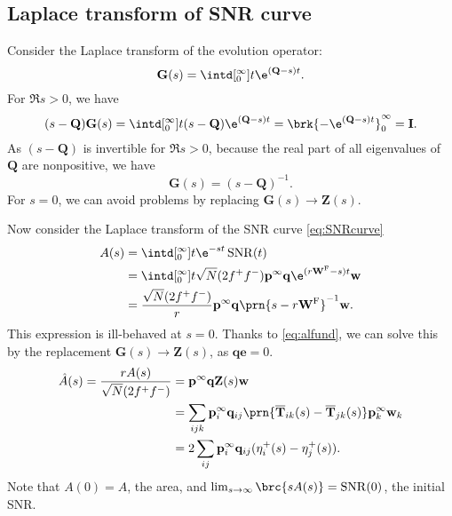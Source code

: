 \documentclass[12pt]{article}
\newcommand{\inv}{^{-1}}
\newcommand{\I}{\mathbf{I}}
\newcommand{\onev}{\mathbf{e}}
\newcommand{\MM}{\mathbf{Q}}
\newcommand{\eq}{\mathbf{p}^\infty}
\newcommand{\fpt}{\mathbf{T}}
\newcommand{\fptb}{\overline{\fpt}}
\newcommand{\fund}{\mathbf{Z}}
\newcommand{\w}{\mathbf{w}}
\newcommand{\W}{\mathbf{W}}
\newcommand{\enc}{\mathbf{q}}
\newcommand{\frg}{\W^{\mathrm{F}}}
\DeclareMathOperator{\SNR}{SNR}
\begin{document}
\subsection{Laplace transform of SNR curve}\label{sec:laplaceSNR}

Consider the Laplace transform of the evolution operator:
%
\begin{equation}\label{eq:levol}
  \mathbf{G}(s) = \intd[_0^{\infty}]{t} \e^{(\MM-s) t}.
\end{equation}
%
For $\Re s>0$, we have
%
\begin{equation}\label{eq:levolcalc}
  (s-\MM)\mathbf{G}(s) = \intd[_0^{\infty}]{t} (s-\MM)\e^{(\MM-s) t} = \brk{-\e^{(\MM-s) t}}_0^{\infty} = \I.
\end{equation}
%
As $(s-\MM)$ is invertible for $\Re s>0$, because the real part of all eigenvalues of $\MM$ are nonpositive, we have
%
\begin{equation}\label{eq:levolres}
  \mathbf{G}(s) = (s-\MM)\inv.
\end{equation}
%
For $s=0$, we can avoid problems by replacing $\mathbf{G}(s) \to \fund(s)$.

Now consider the Laplace transform of the SNR curve \eqref{eq:SNRcurve}
%
\begin{equation}\label{eq:lsnr}
\begin{aligned}
  A(s) &= \intd[_0^{\infty}]{t} \e^{-st}\SNR(t) \\
   &= \intd[_0^{\infty}]{t} \sqrt{N}(2f^+f^-) \eq \enc \e^{(r\frg-s)t} \w \\
   &= \frac{\sqrt{N}(2f^+f^-)}{r} \eq \enc \prn{s - r\frg}\inv \w.
\end{aligned}
\end{equation}
%
This expression is ill-behaved at $s=0$.
Thanks to \eqref{eq:alfund}, we can solve this by the replacement $\mathbf{G}(s) \to \fund(s)$, as $\enc\onev=0$.
%
\begin{equation}\label{eq:larea}
\begin{aligned}
  \hat{A}(s) = \frac{rA(s)}{\sqrt{N}(2f^+f^-)} &=  \eq \enc \fund(s) \w \\
    &= \sum_{ijk} \eq_i \enc_{ij} \prn{\fptb_{ik}(s)-\fptb_{jk}(s)} \eq_k \w_k \\
    &= 2\sum_{ij}  \eq_i \enc_{ij} (\eta^+_{i}(s) - \eta^+_{j}(s)).
\end{aligned}
\end{equation}
%
Note that $A(0)=A$, the area, and $\lim_{s\to\infty} \brc{sA(s)} = \SNR(0)$, the initial SNR.
\end{document}
